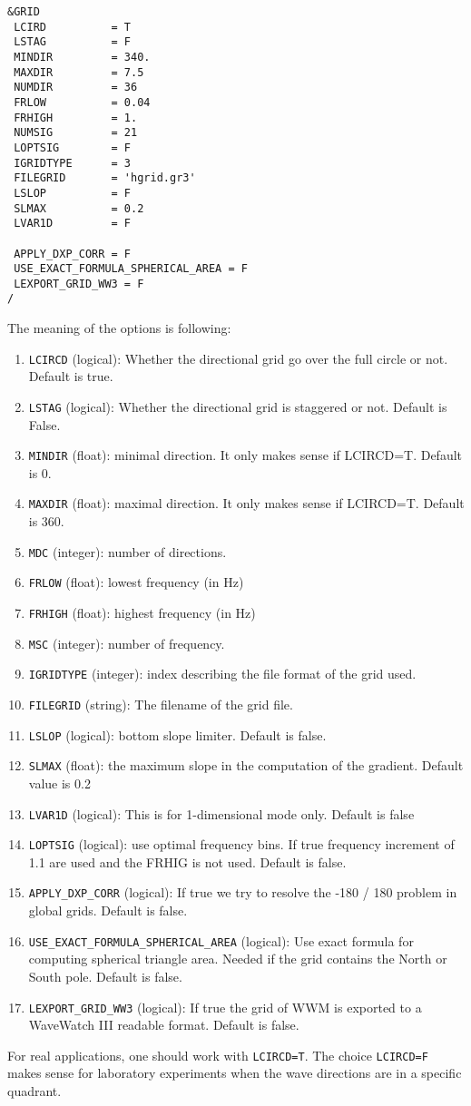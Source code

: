 \documentclass[12pt]{amsart}
\begin{document}
\begin{verbatim}
&GRID
 LCIRD          = T                 
 LSTAG          = F                 
 MINDIR         = 340.              
 MAXDIR         = 7.5               
 NUMDIR         = 36                
 FRLOW          = 0.04              
 FRHIGH         = 1.
 NUMSIG         = 21
 LOPTSIG        = F          
 IGRIDTYPE      = 3
 FILEGRID       = 'hgrid.gr3'
 LSLOP          = F 
 SLMAX          = 0.2 
 LVAR1D         = F

 APPLY_DXP_CORR = F
 USE_EXACT_FORMULA_SPHERICAL_AREA = F
 LEXPORT_GRID_WW3 = F
/
\end{verbatim}
The meaning of the options is following:
\begin{enumerate}
\item {\tt LCIRCD} (logical): Whether the directional grid go over the full circle or not. Default is true.
\item {\tt LSTAG} (logical): Whether the directional grid is staggered or not. Default is False.
\item {\tt MINDIR} (float): minimal direction. It only makes sense if LCIRCD=T. Default is 0.
\item {\tt MAXDIR} (float): maximal direction. It only makes sense if LCIRCD=T. Default is 360.
\item {\tt MDC} (integer): number of directions.
\item {\tt FRLOW} (float): lowest frequency (in Hz)
\item {\tt FRHIGH} (float): highest frequency (in Hz)
\item {\tt MSC} (integer): number of frequency. 
\item {\tt IGRIDTYPE} (integer): index describing the file format of the grid used.
\item {\tt FILEGRID} (string): The filename of the grid file.
\item {\tt LSLOP} (logical): bottom slope limiter. Default is false.
\item {\tt SLMAX} (float): the maximum slope in the computation of the gradient. Default value is 0.2
\item {\tt LVAR1D} (logical): This is for 1-dimensional mode only. Default is false
\item {\tt LOPTSIG} (logical): use optimal frequency bins. If true frequency increment of 1.1 are used and the FRHIG is not used. Default is false.
\item {\tt APPLY\_DXP\_CORR} (logical): If true we try to resolve the -180 / 180 problem in global grids. Default is false.
\item {\tt USE\_EXACT\_FORMULA\_SPHERICAL\_AREA} (logical): Use exact formula for computing spherical triangle area. Needed if the grid contains the North or South pole. Default is false.
\item {\tt LEXPORT\_GRID\_WW3} (logical): If true the grid of WWM is exported to a WaveWatch III readable format. Default is false.
\end{enumerate}
For real applications, one should work with {\tt LCIRCD=T}. The choice {\tt LCIRCD=F} makes sense for laboratory experiments when the wave directions are in a specific quadrant.
\end{document}
